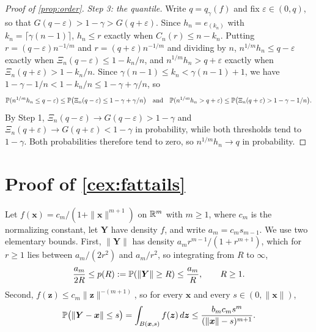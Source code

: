 \begin{proof}[Proof of \cref{prop:order}]
  \emph{Step 3: the quantile.} Write $q=q_\gamma(f)$ and fix $\varepsilon\in(0,q)$, so that $G(q-\varepsilon)>1-\gamma>G(q+\varepsilon)$. Since $h_n=e_{(k_n)}$ with $k_n=\lceil\gamma(n-1)\rceil$, $h_n\le r$ exactly when $C_n(r)\le n-k_n$. Putting $r=(q-\varepsilon)n^{-1/m}$ and $r=(q+\varepsilon)n^{-1/m}$ and dividing by $n$, $n^{1/m}h_n\le q-\varepsilon$ exactly when $\Xi_n(q-\varepsilon)\le1-k_n/n$, and $n^{1/m}h_n>q+\varepsilon$ exactly when $\Xi_n(q+\varepsilon)>1-k_n/n$. Since $\gamma(n-1)\le k_n<\gamma(n-1)+1$, we have $1-\gamma-1/n<1-k_n/n\le1-\gamma+\gamma/n$, so
  $$
  \P(n^{1/m}h_n\le q-\varepsilon)\le\P\big(\Xi_n(q-\varepsilon)\le1-\gamma+\gamma/n\big)
  \quad\text{and}\quad
  \P(n^{1/m}h_n>q+\varepsilon)\le\P\big(\Xi_n(q+\varepsilon)>1-\gamma-1/n\big).
  $$
  By Step 1, $\Xi_n(q-\varepsilon)\to G(q-\varepsilon)>1-\gamma$ and $\Xi_n(q+\varepsilon)\to G(q+\varepsilon)<1-\gamma$ in probability, while both thresholds tend to $1-\gamma$. Both probabilities therefore tend to zero, so $n^{1/m}h_n\to q$ in probability.
\end{proof}

\section{Proof of \texorpdfstring{\cref{cex:fattails}}{Counterexample 1}}

Let $f(\bm{x})=c_m/(1+\|\bm{x}\|^{m+1})$ on $\R^m$ with $m\ge1$, where $c_m$ is the normalizing constant, let $\bm{Y}$ have density $f$, and write $a_m=c_ms_{m-1}$. We use two elementary bounds. First, $\|\bm{Y}\|$ has density $a_mr^{m-1}/(1+r^{m+1})$, which for $r\ge1$ lies between $a_m/(2r^2)$ and $a_m/r^2$, so integrating from $R$ to $\infty$,
\begin{equation}\label{eq:tailprob}
  \frac{a_m}{2R}\le p(R):=\P(\|\bm{Y}\|\ge R)\le\frac{a_m}{R},\qquad R\ge1.
\end{equation}
Second, $f(\bm{z})\le c_m\|\bm{z}\|^{-(m+1)}$, so for every $\bm{x}$ and every $s\in(0,\|\bm{x}\|)$,
\begin{equation}\label{eq:ballprob}
  \P\big(\|\bm{Y}-\bm{x}\|\le s\big)=\int_{B(\bm{x},s)}f(\bm{z})\,d\bm{z}\le\frac{b_mc_ms^m}{(\|\bm{x}\|-s)^{m+1}}.
\end{equation}


